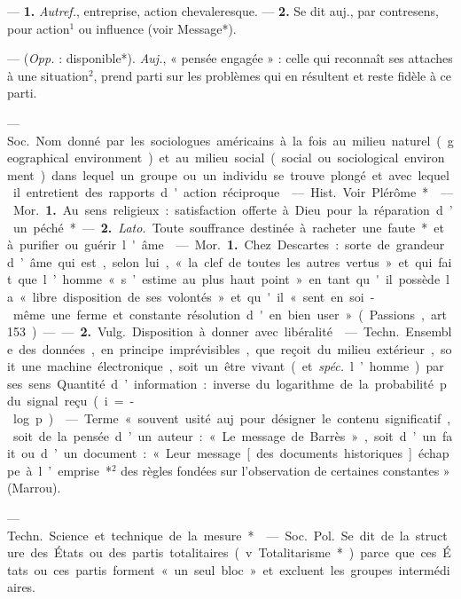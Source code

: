 \begin{itemize}[leftmargin=1cm, label=, itemsep=1pt]
 — {\bf 1.} {\it Autref.}, entreprise,
action chevaleresque. — {\bf 2.} Se dit
auj., par contresens, pour action$^1$
ou influence (voir Message*).

 — ({\it Opp.} : disponible*).
{\it Auj.}, « pensée engagée » : celle qui
reconnaît ses attaches à une situation$^2$, prend parti sur les problèmes
qui en résultent et reste fidèle
à ce parti.

 — \si{Soc.} Nom donné
par les sociologues américains à la
fois au milieu naturel (geographical
environment) et au milieu social
(social ou sociological environment)
dans lequel un groupe ou un individu se trouve plongé et avec lequel
il entretient des rapports d'action
réciproque.

 — \si{Hist.} Voir Plérôme*.

 — \si{Mor.} {\bf 1.} Au sens religieux : satisfaction offerte à Dieu
pour la réparation d’un péché*.

— {\bf 2.} {\it Lato.} Toute souffrance destinée
à racheter une faute* et à purifier
ou guérir l'âme.

 — \si{Mor.} {\bf 1.} Chez Descartes : sorte de grandeur d’âme
qui est, selon lui, « la clef de toutes
les autres vertus » et qui fait que
l’homme « s’estime au plus haut
point » en tant qu'il possède la
« libre disposition de ses volontés »
et qu'il « sent en soi-même une
ferme et constante résolution d'en
bien user » (Passions, art. 153). ——
 {\bf 2.} \si{Vulg.} Disposition à donner avec
libéralité.

 — \si{Techn.} Ensemble
des données, en principe imprévisibles, que reçoit du milieu extérieur, soit une machine électronique, soit un être vivant (et {\it spéc.}
l’homme) par ses sens. Quantité
d’information : inverse du logarithme de la probabilité p du
signal reçu (i = - log p).

 — Terme «souvent usité
auj. pour désigner le contenu significatif, soit de la pensée d’un auteur : « Le message de Barrès »,
soit d’un fait ou d’un document :
« Leur message [des documents
historiques] échappe à l’emprise*$^2$
des règles fondées sur l'observation
de certaines constantes » (Marrou).

 — \si{Techn.} Science et technique de la mesure*.

 — \si{Soc.} \si{Pol.} Se dit de
la structure des États ou des partis totalitaires (v. Totalitarisme*)
parce que ces États ou ces partis
forment « un seul bloc » et excluent les groupes intermédiaires.


\end{itemize}
